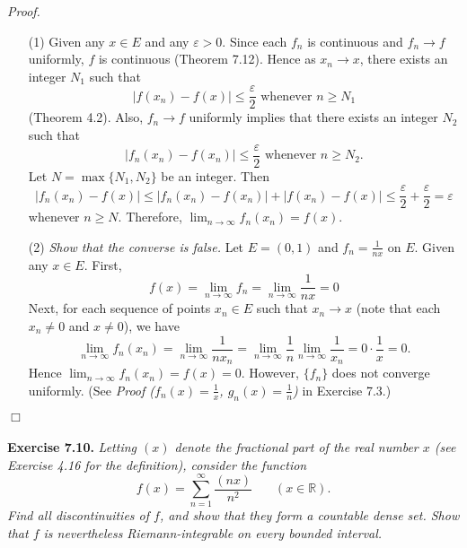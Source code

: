 \documentclass{article}
\begin{document}
\emph{Proof.}
\begin{enumerate}
  \item[(1)]
  Given any $x \in E$ and any $\varepsilon > 0$.
  Since each $f_n$ is continuous and $f_n \to f$ uniformly,
  $f$ is continuous (Theorem 7.12).
  Hence as $x_n \to x$, there exists an integer $N_1$
  such that
  \[
    |f(x_n) - f(x)| \leq \frac{\varepsilon}{2}
    \text{ whenever } n \geq N_1
  \]
  (Theorem 4.2).
  Also, $f_n \to f$ uniformly implies that there exists an integer $N_2$
  such that
  \[
    |f_n(x_n) - f(x_n)| \leq \frac{\varepsilon}{2}
    \text{ whenever } n \geq N_2.
  \]
  Let $N = \max\{N_1,N_2\}$ be an integer.
  Then
  \[
    |f_n(x_n) - f(x)|
    \leq |f_n(x_n) - f(x_n)| + |f(x_n) - f(x)|
    \leq \frac{\varepsilon}{2} + \frac{\varepsilon}{2}
    = \varepsilon
  \]
  whenever $n \geq N$.
  Therefore, $\lim_{n \to \infty} f_n(x_n) = f(x)$.

  \item[(2)]
  \emph{Show that the converse is false.}
  Let $E = (0,1)$ and $f_n = \frac{1}{nx}$ on $E$.
  Given any $x \in E$.
  First,
  \[
    f(x) = \lim_{n \to \infty} f_n = \lim_{n \to \infty} \frac{1}{nx} = 0
  \]
  Next, for each sequence of points $x_n \in E$ such that $x_n \to x$
  (note that each $x_n \neq 0$ and $x \neq 0$), we have
  \[
    \lim_{n \to \infty} f_n(x_n)
    = \lim_{n \to \infty} \frac{1}{nx_n}
    = \lim_{n \to \infty} \frac{1}{n} \lim_{n \to \infty} \frac{1}{x_n}
    = 0 \cdot \frac{1}{x}
    = 0.
  \]
  Hence $\lim_{n \to \infty} f_n(x_n) = f(x) = 0$.
  However, $\{f_n\}$ does not converge uniformly.
  (See \emph{Proof ($f_n(x) = \frac{1}{x}$, $g_n(x) = \frac{1}{n}$)} in Exercise 7.3.)
\end{enumerate}
$\Box$ \\\\






\textbf{Exercise 7.10.}
\emph{Letting $(x)$ denote the fractional part of the real number $x$
(see Exercise 4.16 for the definition),
consider the function
\[
  f(x) = \sum_{n=1}^{\infty} \frac{(nx)}{n^2}
  \:\:\:\:\:\:\:\:
  (x \in \mathbb{R}).
\]
Find all discontinuities of $f$, and show that they form a countable dense set.
Show that $f$ is nevertheless Riemann-integrable on every bounded interval.} \\
\end{document}
